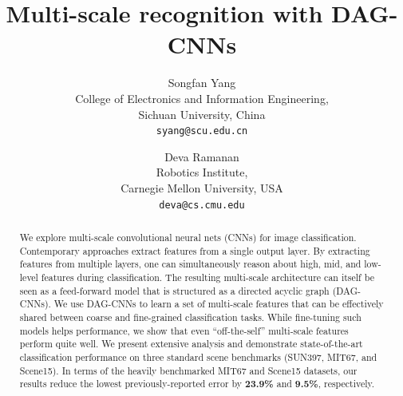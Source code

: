 \documentclass[10pt,twocolumn,letterpaper]{article}
\begin{document}
\title{Multi-scale recognition with DAG-CNNs}

\author{Songfan Yang\\
College of Electronics and Information Engineering,\\
Sichuan University, China\\
{\tt\small syang@scu.edu.cn}
\and
Deva Ramanan\\
Robotics Institute,\\
Carnegie Mellon University, USA\\
{\tt\small deva@cs.cmu.edu}
}

\maketitle


\begin{abstract}
We explore multi-scale convolutional neural nets (CNNs) for image classification. Contemporary approaches extract features from a single output layer. By extracting features from multiple layers, one can simultaneously reason about high, mid, and low-level features during classification. The resulting multi-scale architecture can itself be seen as a feed-forward model that is structured as a directed acyclic graph (DAG-CNNs). %
We use DAG-CNNs to learn a set of multi-scale features that can be effectively shared between coarse and fine-grained classification tasks. While fine-tuning such models helps performance, we show that even ``off-the-self'' multi-scale features perform quite well. We present extensive analysis and demonstrate state-of-the-art classification performance on three standard scene benchmarks (SUN397, MIT67, and Scene15). %
In terms of the heavily benchmarked MIT67 and Scene15 datasets, our results reduce the lowest previously-reported error by {\bf 23.9\%} and {\bf 9.5\%}, respectively.
\end{abstract}
\end{document}
